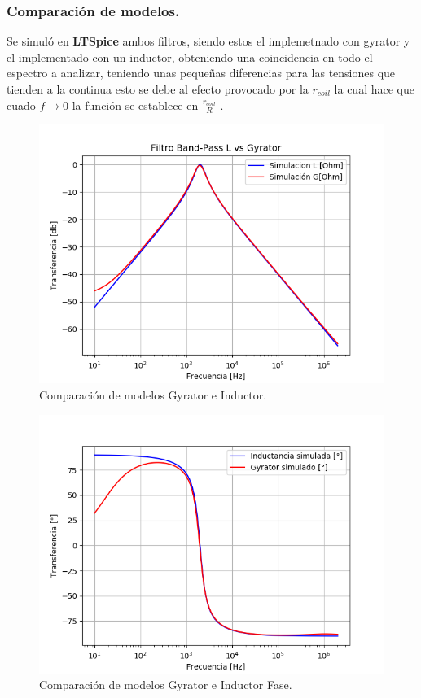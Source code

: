\documentclass[a4paper]{article}
\begin{document}
\subsubsection{Comparación de modelos.}
Se simuló en \textbf{LTSpice} ambos filtros, siendo estos el implemetnado con gyrator y el implementado con un inductor, obteniendo una coincidencia en todo el espectro a analizar, teniendo unas pequeñas diferencias para las tensiones que tienden a la continua esto se debe al efecto provocado por la $r_{coil}$ la cual hace que cuado $f \rightarrow 0$ la función se establece en $\frac{r_{coil}}{R}$ .
\begin{figure}[H]	
	\centering
	\includegraphics[width=\textwidth]{ImagenesEj2/simBP.PNG}
	\caption{Comparación de modelos Gyrator e Inductor.}
	\label{fig:gyrIndBP}
\end{figure}
\begin{figure}[H]	
	\centering
	\includegraphics[width=\textwidth]{ImagenesEj2/simBPP.PNG}
	\caption{Comparación de modelos Gyrator e Inductor Fase.}
	\label{fig:gyrIndPBP}
\end{figure}
\end{document}
